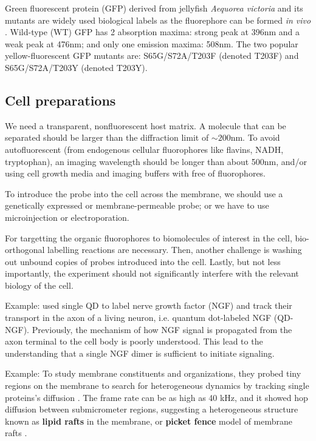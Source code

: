 Green fluorescent protein (GFP) derived from jellyfish {\it Aequorea victoria}
and its mutants are widely used biological labels as the fluorephore can be
formed {\it in vivo} \citep{dickson1997}. Wild-type (WT) GFP has 2 absorption
maxima: strong peak at 396nm and a weak peak at 476nm; and only one emission
maxima: 508nm. The two popular yellow-fluorescent GFP mutants are:
S65G/S72A/T203F (denoted T203F) and S65G/S72A/T203Y (denoted T203Y).


\subsection{Cell preparations}

We need a transparent, nonfluorescent host matrix. A molecule that can be
separated should be larger than the diffraction limit of $\sim 200$nm. To avoid
autofluorescent (from endogenous cellular fluorophores like flavins, NADH,
tryptophan), an imaging wavelength should be longer than about 500nm, and/or
using cell growth media and imaging buffers with free of fluorophores.

To introduce the probe into the cell across the membrane, we should use a
genetically expressed or membrane-permeable probe; or we have to use
microinjection or electroporation. 

For targetting the organic fluorophores to biomolecules of interest in the cell,
bio-orthogonal labelling reactions are necessary. Then, another challenge is
washing out unbound copies of probes introduced into the cell. Lastly, but not
less importantly, the experiment should not significantly interfere with the
relevant biology of the cell.

Example: \citep{cui2007} used single QD to label nerve growth factor (NGF) and
track their transport in the axon of a living neuron, i.e. quantum dot-labeled
NGF (QD-NGF). Previously, the mechanism of how NGF signal is propagated from the
axon terminal to the cell body is poorly understood. This lead to the
understanding that a single NGF dimer is sufficient to initiate signaling. 

Example: To study membrane constituents and organizations, they probed tiny
regions on the membrane to search for heterogeneous dynamics by tracking single
proteins's diffusion \citep{kusumi2005}. The frame rate can be as high as 40
kHz, and it showed hop diffusion between submicrometer regions, suggesting a
heterogeneous structure known as {\bf lipid rafts} in the membrane, or {\bf
picket fence} model of membrane rafts \citep{kusumi1996}.

